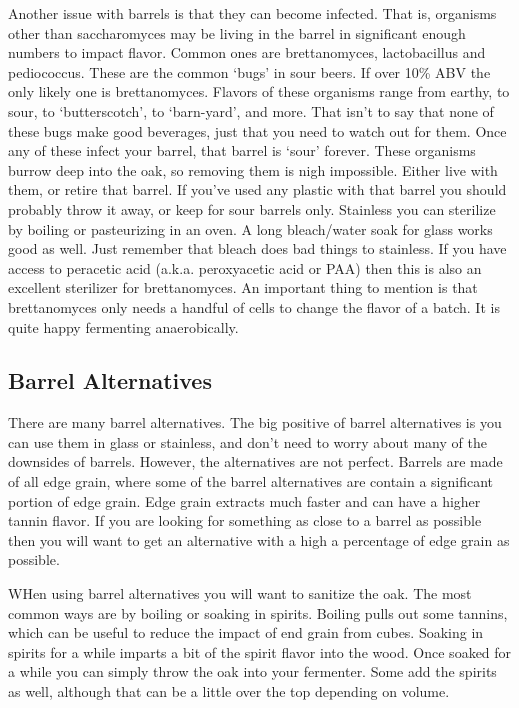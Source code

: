    Another issue with barrels is that they can become infected. That is, organisms other than saccharomyces may be
   living in the barrel in significant enough numbers to impact flavor. Common ones are brettanomyces, lactobacillus
   and pediococcus. These are the common `bugs' in sour beers. If over 10\% ABV the only likely one is brettanomyces.
   Flavors of these organisms range from earthy, to sour, to `butterscotch', to `barn-yard', and more. That isn't to
   say that none of these bugs make good beverages, just that you need to watch out for them.
   Once any of these infect your barrel, that barrel is `sour' forever. These organisms burrow deep into the oak, so
   removing them is nigh impossible. Either live with them, or retire that barrel. If you've used any plastic with that
   barrel you should probably throw it away, or keep for sour barrels only. Stainless you can sterilize by boiling or
   pasteurizing in an oven. A long bleach/water soak for glass works good as well. Just remember that bleach does bad
   things to stainless. If you have access to peracetic acid (a.k.a. peroxyacetic acid or PAA) then this is also an
   excellent sterilizer for brettanomyces. An important thing to mention is that brettanomyces only needs a handful of
   cells to change the flavor of a batch. It is quite happy fermenting anaerobically.


 \subsection{Barrel Alternatives}
  There are many barrel alternatives. The big positive of barrel alternatives is you can use them in glass
  or stainless, and don't need to worry about many of the downsides of barrels. However, the
  alternatives are not perfect. Barrels are made of all edge grain, where some of the barrel alternatives are
  contain a significant portion of edge grain. Edge grain extracts much faster and can have a higher tannin
  flavor. If you are looking for something as close to a barrel as possible then you will want to get an
  alternative with a high a percentage of edge grain as possible.

  WHen using barrel alternatives you will want to sanitize the oak. The most common ways are by boiling 
  or soaking in spirits. Boiling pulls out some tannins, which can be useful to reduce the impact of 
  end grain from cubes. Soaking in spirits for a while imparts a bit of the spirit flavor into the wood. Once
  soaked for a while you can simply throw the oak into your fermenter. Some add the spirits as well, although
  that can be a little over the top depending on volume.

